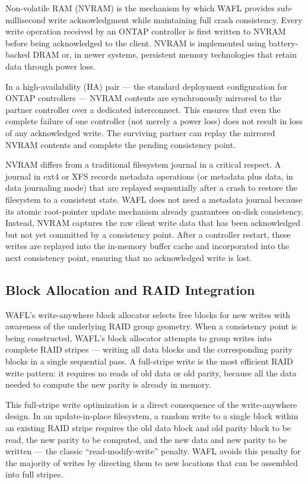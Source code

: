 Non-volatile RAM (NVRAM) is the mechanism by which WAFL provides sub-millisecond write acknowledgment while maintaining full crash consistency. Every write operation received by an ONTAP controller is first written to NVRAM before being acknowledged to the client. NVRAM is implemented using battery-backed DRAM or, in newer systems, persistent memory technologies that retain data through power loss.

In a high-availability (HA) pair --- the standard deployment configuration for ONTAP controllers --- NVRAM contents are synchronously mirrored to the partner controller over a dedicated interconnect. This ensures that even the complete failure of one controller (not merely a power loss) does not result in loss of any acknowledged write. The surviving partner can replay the mirrored NVRAM contents and complete the pending consistency point.

NVRAM differs from a traditional filesystem journal in a critical respect. A journal in ext4 or XFS records metadata operations (or metadata plus data, in data journaling mode) that are replayed sequentially after a crash to restore the filesystem to a consistent state. WAFL does not need a metadata journal because its atomic root-pointer update mechanism already guarantees on-disk consistency. Instead, NVRAM captures the raw client write data that has been acknowledged but not yet committed by a consistency point. After a controller restart, these writes are replayed into the in-memory buffer cache and incorporated into the next consistency point, ensuring that no acknowledged write is lost.

\subsection{Block Allocation and RAID Integration}

WAFL's write-anywhere block allocator selects free blocks for new writes with awareness of the underlying RAID group geometry. When a consistency point is being constructed, WAFL's block allocator attempts to group writes into complete RAID stripes --- writing all data blocks and the corresponding parity blocks in a single sequential pass. A full-stripe write is the most efficient RAID write pattern: it requires no reads of old data or old parity, because all the data needed to compute the new parity is already in memory.

This full-stripe write optimization is a direct consequence of the write-anywhere design. In an update-in-place filesystem, a random write to a single block within an existing RAID stripe requires the old data block and old parity block to be read, the new parity to be computed, and the new data and new parity to be written --- the classic ``read-modify-write'' penalty. WAFL avoids this penalty for the majority of writes by directing them to new locations that can be assembled into full stripes.

